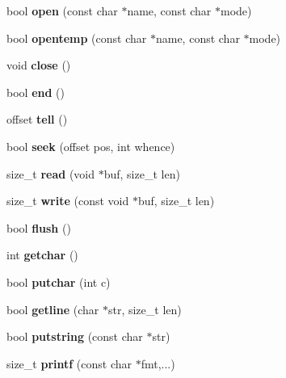 \begin{DoxyCompactItemize}
\item 
\mbox{\label{structfilestream_a18c1c59809a3774a95727d8953565ae8}} 
bool {\bfseries open} (const char $\ast$name, const char $\ast$mode)
\item 
\mbox{\label{structfilestream_a9a37bf4a3fd00013950005926c2ccfdf}} 
bool {\bfseries opentemp} (const char $\ast$name, const char $\ast$mode)
\item 
\mbox{\label{structfilestream_ac030b860055a2d12d59c2289369c3790}} 
void {\bfseries close} ()
\item 
\mbox{\label{structfilestream_a894051c3ef1f83f09f1ee4056fd59d1e}} 
bool {\bfseries end} ()
\item 
\mbox{\label{structfilestream_a30343412639d00eba3c738791d2ee4c1}} 
offset {\bfseries tell} ()
\item 
\mbox{\label{structfilestream_a29d1cb0d40f08d28bd2b0ca5ad183399}} 
bool {\bfseries seek} (offset pos, int whence)
\item 
\mbox{\label{structfilestream_ab716330fc2db84e71b94c1b48d4ae582}} 
size\+\_\+t {\bfseries read} (void $\ast$buf, size\+\_\+t len)
\item 
\mbox{\label{structfilestream_ac85ef07dc763c61cd32d84ce240ce614}} 
size\+\_\+t {\bfseries write} (const void $\ast$buf, size\+\_\+t len)
\item 
\mbox{\label{structfilestream_ab67368c92e2e3f183b711c9d6d71917d}} 
bool {\bfseries flush} ()
\item 
\mbox{\label{structfilestream_a26df7bffcdea0440c1a9ca8706e24e2f}} 
int {\bfseries getchar} ()
\item 
\mbox{\label{structfilestream_a59ce02b686f4d15f391a212d9c97e107}} 
bool {\bfseries putchar} (int c)
\item 
\mbox{\label{structfilestream_a8e4bff33ab483af9b0d4df89e97b430c}} 
bool {\bfseries getline} (char $\ast$str, size\+\_\+t len)
\item 
\mbox{\label{structfilestream_a3ee81c389171cf8df112ed55705f8812}} 
bool {\bfseries putstring} (const char $\ast$str)
\item 
\mbox{\label{structfilestream_a5eb1166b6dffb71df3f8c9eaf95248e6}} 
size\+\_\+t {\bfseries printf} (const char $\ast$fmt,...)
\end{DoxyCompactItemize}
